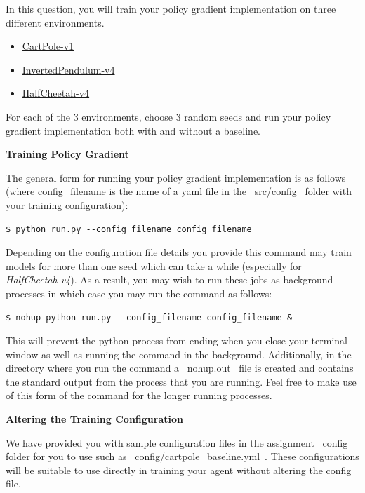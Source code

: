 \item {}

In this question, you will train your policy gradient implementation on three different environments.

\begin{itemize}
	\item \href{https://www.gymlibrary.ml/environments/classic_control/cart_pole/}{CartPole-v1}
	\item \href{https://www.gymlibrary.ml/environments/mujoco/inverted_pendulum/}{InvertedPendulum-v4}
	\item \href{https://www.gymlibrary.ml/environments/mujoco/half_cheetah/}{HalfCheetah-v4}
\end{itemize}

For each of the 3 environments, choose 3 random seeds and run your policy gradient implementation both with and without a baseline.

\clearpage
\textbf{Training Policy Gradient}

The general form for running your policy gradient implementation is as follows (where config\_filename is the name of a yaml file in the ~src/config~ folder with your training configuration):

\begin{lstlisting}
$ python run.py --config_filename config_filename
\end{lstlisting}

Depending on the configuration file details you provide this command may train models for more than one seed which can take a while (especially for \textit{HalfCheetah-v4}). As a result, you may wish to run these jobs as background processes in which case you may run the command as follows:

\begin{lstlisting}
$ nohup python run.py --config_filename config_filename &
\end{lstlisting}

This will prevent the python process from ending when you close your terminal window as well as running the command in the background. Additionally, in the directory where you run the command a ~nohup.out~ file is created and contains the standard output from the process that you are running. Feel free to make use of this form of the command for the longer running processes.

\textbf{Altering the Training Configuration}

We have provided you with sample configuration files in the assignment ~config~ folder for you to use such as ~config/cartpole_baseline.yml~. These configurations will be suitable to use directly in training your agent without altering the config file.

